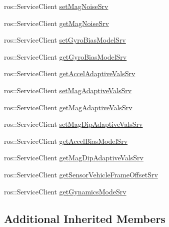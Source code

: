 \begin{DoxyCompactItemize}
\item 
ros\+::\+Service\+Client \hyperlink{classcl__microstrain__mips__client_1_1ClMicrostainMips_abf0b2a8818a8936e6aae2d9ac1f0e6a8}{set\+Mag\+Noise\+Srv}
\item 
ros\+::\+Service\+Client \hyperlink{classcl__microstrain__mips__client_1_1ClMicrostainMips_a872e3d9a2580ffea04492bf91d5aa2d3}{get\+Mag\+Noise\+Srv}
\item 
ros\+::\+Service\+Client \hyperlink{classcl__microstrain__mips__client_1_1ClMicrostainMips_a2736cf2b481877e1be5a66dc700851ba}{set\+Gyro\+Bias\+Model\+Srv}
\item 
ros\+::\+Service\+Client \hyperlink{classcl__microstrain__mips__client_1_1ClMicrostainMips_acc435ae8dd2cabd66590f2575373a2bf}{get\+Gyro\+Bias\+Model\+Srv}
\item 
ros\+::\+Service\+Client \hyperlink{classcl__microstrain__mips__client_1_1ClMicrostainMips_a237ad9bcfa0cb65da14183c8c7a5f7fb}{get\+Accel\+Adaptive\+Vals\+Srv}
\item 
ros\+::\+Service\+Client \hyperlink{classcl__microstrain__mips__client_1_1ClMicrostainMips_aaa3e236c737600691cacc4e43d758ec8}{set\+Mag\+Adaptive\+Vals\+Srv}
\item 
ros\+::\+Service\+Client \hyperlink{classcl__microstrain__mips__client_1_1ClMicrostainMips_a69d777f77520e9cb8c01bdb5b143e5c6}{get\+Mag\+Adaptive\+Vals\+Srv}
\item 
ros\+::\+Service\+Client \hyperlink{classcl__microstrain__mips__client_1_1ClMicrostainMips_a05a95ac9c62fde0b9298cac2d73f2671}{set\+Mag\+Dip\+Adaptive\+Vals\+Srv}
\item 
ros\+::\+Service\+Client \hyperlink{classcl__microstrain__mips__client_1_1ClMicrostainMips_a5053ae6d836fd030bcf8a0efc9d2cc93}{get\+Accel\+Bias\+Model\+Srv}
\item 
ros\+::\+Service\+Client \hyperlink{classcl__microstrain__mips__client_1_1ClMicrostainMips_a0b7bd4a97611b2cfa5b91253c3d27662}{get\+Mag\+Dip\+Adaptive\+Vals\+Srv}
\item 
ros\+::\+Service\+Client \hyperlink{classcl__microstrain__mips__client_1_1ClMicrostainMips_a8b70591e046ce7df01712b2df397dfac}{get\+Sensor\+Vehicle\+Frame\+Offset\+Srv}
\item 
ros\+::\+Service\+Client \hyperlink{classcl__microstrain__mips__client_1_1ClMicrostainMips_ad7926347ef07f5ad44ce79f67154440f}{get\+Gynamics\+Mode\+Srv}
\end{DoxyCompactItemize}
\subsection*{Additional Inherited Members}



